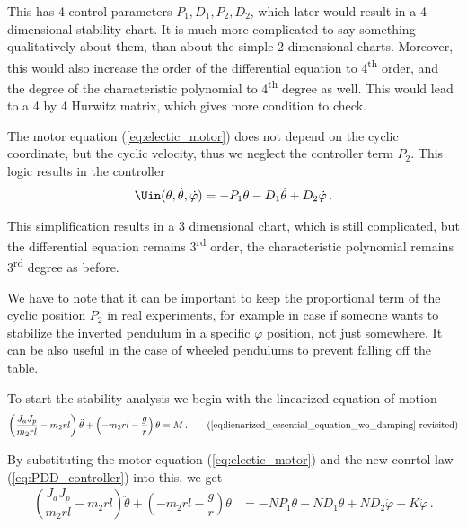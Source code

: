 This has 4 control parameters $P_1, D_1, P_2, D_2$, which later would result in a 4 dimensional stability chart. It is much more complicated to  say something qualitatively about them, than about the simple 2 dimensional charts. Moreover, this would also increase the order of the differential equation to 4\textsuperscript{th} order, and the degree of the characteristic polynomial to 4\textsuperscript{th} degree as well. This would lead to a 4 by 4 Hurwitz matrix, which gives more condition to check. 

The motor equation (\ref{eq:electic_motor}) does not depend on the cyclic coordinate, but the cyclic velocity, thus we neglect the controller term $P_2$. This logic results in the \PDD{} controller
\begin{align}
		\Uin(\theta, \dot\theta, \dot{\varphi}) = -P_1\theta -D_1\dot\theta + D_2\dot\varphi\,. \label{eq:PDD_controller}
\end{align}

This simplification results in a 3 dimensional chart, which is still complicated, but the differential equation remains 3\textsuperscript{rd} order, the characteristic polynomial remains 3\textsuperscript{rd} degree as before.


We have to note that it can be important to keep the proportional term of the cyclic position $P_2$ in real experiments, for example in case if someone wants to stabilize the inverted pendulum in a specific $\varphi$ position, not just somewhere. It can be also useful in the case of wheeled pendulums to prevent falling off the table. 
%
%





To start the stability analysis we begin with the linearized equation of motion
\begin{align*}
\left(\dfrac{J_a J_p}{m_2 r l}- m_2 r l\right) \ddot \theta + \left(-m_2 r l - \dfrac{g}{r}\right) \theta = M\,. \tag{\ref{eq:lienarized_essential_equation_wo_damping} revisited}
\end{align*}

\noindent
By substituting the motor equation (\ref{eq:electic_motor}) and the new  \PDD{} conrtol law (\ref{eq:PDD_controller}) into this, we get
\begin{align}
\left(\dfrac{J_a J_p}{m_2 r l}- m_2 r l\right) \ddot \theta + \left(-m_2 r l - \dfrac{g}{r}\right) \theta &=  -NP_1\theta -ND_1\dot{\theta} + ND_2 \dot{\varphi} -K\dot{\varphi}\,.
\end{align}

